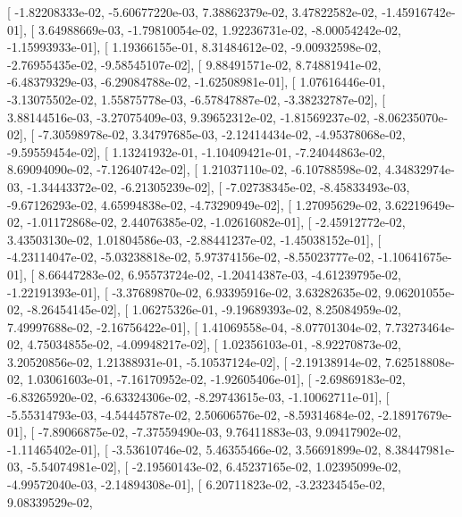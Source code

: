 \documentclass{article}
\begin{document}
       [ -1.82208333e-02,  -5.60677220e-03,   7.38862379e-02,
          3.47822582e-02,  -1.45916742e-01],
       [  3.64988669e-03,  -1.79810054e-02,   1.92236731e-02,
         -8.00054242e-02,  -1.15993933e-01],
       [  1.19366155e-01,   8.31484612e-02,  -9.00932598e-02,
         -2.76955435e-02,  -9.58545107e-02],
       [  9.88491571e-02,   8.74881941e-02,  -6.48379329e-03,
         -6.29084788e-02,  -1.62508981e-01],
       [  1.07616446e-01,  -3.13075502e-02,   1.55875778e-03,
         -6.57847887e-02,  -3.38232787e-02],
       [  3.88144516e-03,  -3.27075409e-03,   9.39652312e-02,
         -1.81569237e-02,  -8.06235070e-02],
       [ -7.30598978e-02,   3.34797685e-03,  -2.12414434e-02,
         -4.95378068e-02,  -9.59559454e-02],
       [  1.13241932e-01,  -1.10409421e-01,  -7.24044863e-02,
          8.69094090e-02,  -7.12640742e-02],
       [  1.21037110e-02,  -6.10788598e-02,   4.34832974e-03,
         -1.34443372e-02,  -6.21305239e-02],
       [ -7.02738345e-02,  -8.45833493e-03,  -9.67126293e-02,
          4.65994838e-02,  -4.73290949e-02],
       [  1.27095629e-02,   3.62219649e-02,  -1.01172868e-02,
          2.44076385e-02,  -1.02616082e-01],
       [ -2.45912772e-02,   3.43503130e-02,   1.01804586e-03,
         -2.88441237e-02,  -1.45038152e-01],
       [ -4.23114047e-02,  -5.03238818e-02,   5.97374156e-02,
         -8.55023777e-02,  -1.10641675e-01],
       [  8.66447283e-02,   6.95573724e-02,  -1.20414387e-03,
         -4.61239795e-02,  -1.22191393e-01],
       [ -3.37689870e-02,   6.93395916e-02,   3.63282635e-02,
          9.06201055e-02,  -8.26454145e-02],
       [  1.06275326e-01,  -9.19689393e-02,   8.25084959e-02,
          7.49997688e-02,  -2.16756422e-01],
       [  1.41069558e-04,  -8.07701304e-02,   7.73273464e-02,
          4.75034855e-02,  -4.09948217e-02],
       [  1.02356103e-01,  -8.92270873e-02,   3.20520856e-02,
          1.21388931e-01,  -5.10537124e-02],
       [ -2.19138914e-02,   7.62518808e-02,   1.03061603e-01,
         -7.16170952e-02,  -1.92605406e-01],
       [ -2.69869183e-02,  -6.83265920e-02,  -6.63324306e-02,
         -8.29743615e-03,  -1.10062711e-01],
       [ -5.55314793e-03,  -4.54445787e-02,   2.50606576e-02,
         -8.59314684e-02,  -2.18917679e-01],
       [ -7.89066875e-02,  -7.37559490e-03,   9.76411883e-03,
          9.09417902e-02,  -1.11465402e-01],
       [ -3.53610746e-02,   5.46355466e-02,   3.56691899e-02,
          8.38447981e-03,  -5.54074981e-02],
       [ -2.19560143e-02,   6.45237165e-02,   1.02395099e-02,
         -4.99572040e-03,  -2.14894308e-01],
       [  6.20711823e-02,  -3.23234545e-02,   9.08339529e-02,
\end{document}
